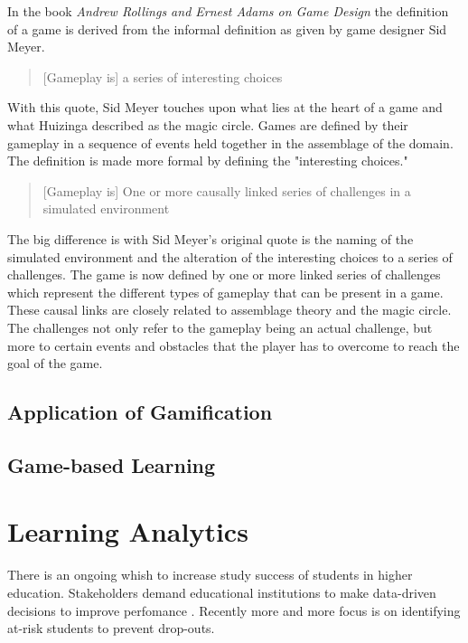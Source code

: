 \documentclass[11pt]{article}
\begin{document}
In the book \emph{Andrew Rollings and Ernest Adams on Game Design} \cite{Rollings2003} the definition of a game is derived from the informal definition as given by game designer Sid Meyer.
\begin{quotation}
	[Gameplay is] a series of interesting choices
\end{quotation}

With this quote, Sid Meyer touches upon what lies at the heart of a game and what Huizinga described as the magic circle. Games are defined by their gameplay in a sequence of events held together in the assemblage of the domain. The definition is made more formal by defining the "interesting choices." 

\begin{quotation}
	[Gameplay is] One or more causally linked series of challenges in a simulated environment \cite{Rollings2003}
\end{quotation}

The big difference is with Sid Meyer's original quote is the naming of the simulated environment and the alteration of the interesting choices to a series of challenges. The game is now defined by one or more linked series of challenges which represent the different types of gameplay that can be present in a game. These causal links are closely related to assemblage theory and the magic circle. The challenges not only refer to the gameplay being an actual challenge, but more to certain events and obstacles that the player has to overcome to reach the goal of the game.


\subsection{Application of Gamification}



\subsection{Game-based Learning}




\section{Learning Analytics}
There is an ongoing whish to increase study success of students in higher education. Stakeholders demand educational institutions to make data-driven decisions to improve perfomance \cite{Ferguson2012a}. Recently more and more focus is on identifying at-risk students to prevent drop-outs.
\end{document}
